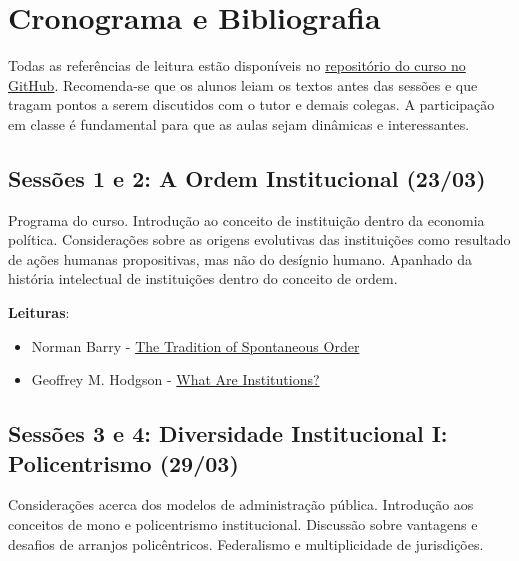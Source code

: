 \documentclass[12pt,]{article}
\providecommand{\tightlist}{%
  \setlength{\itemsep}{0pt}\setlength{\parskip}{0pt}}
\begin{document}
\newpage

\section{Cronograma e Bibliografia}\label{cronograma-e-bibliografia}

Todas as referências de leitura estão disponíveis no
\href{https://github.com/danilofreire/economia-politica-instituicoes-ufm}{repositório
do curso no GitHub}. Recomenda-se que os alunos leiam os textos antes
das sessões e que tragam pontos a serem discutidos com o tutor e demais
colegas. A participação em classe é fundamental para que as aulas sejam
dinâmicas e interessantes.

\subsection{Sessões 1 e 2: A Ordem Institucional
(23/03)}\label{sessoes-1-e-2-a-ordem-institucional-2303}

Programa do curso. Introdução ao conceito de instituição dentro da
economia política. Considerações sobre as origens evolutivas das
instituições como resultado de ações humanas propositivas, mas não do
desígnio humano. Apanhado da história intelectual de instituições dentro
do conceito de ordem.

\textbf{Leituras}:

\begin{itemize}
\tightlist
\item
  Norman Barry -
  \href{https://github.com/danilofreire/economia-politica-instituicoes-ufm/blob/master/sessoes-01-02/barry.pdf}{The
  Tradition of Spontaneous Order}
\item
  Geoffrey M. Hodgson -
  \href{https://github.com/danilofreire/economia-politica-instituicoes-ufm/blob/master/sessoes-01-02/hodgson.pdf}{What
  Are Institutions?}
\end{itemize}

\subsection{Sessões 3 e 4: Diversidade Institucional I: Policentrismo
(29/03)}\label{sessoes-3-e-4-diversidade-institucional-i-policentrismo-2903}

Considerações acerca dos modelos de administração pública. Introdução
aos conceitos de mono e policentrismo institucional. Discussão sobre
vantagens e desafios de arranjos policêntricos. Federalismo e
multiplicidade de jurisdições.
\end{document}
